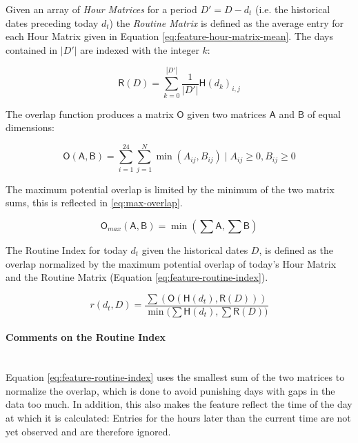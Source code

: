 Given an array of \textit{Hour Matrices} for a period $D' = D - d_t$ (i.e. the historical dates preceding today $d_t$) the \textit{Routine Matrix} is defined as the average entry for each Hour Matrix given in Equation \eqref{eq:feature-hour-matrix-mean}. The days contained in $|D'|$ are indexed with the integer $k$:

\begin{equation}
\label{eq:feature-hour-matrix-mean}
\mathsf{R}(D) = \sum_{k=0}^{|D'|} \frac{1}{|D'|} \mathsf{H}(d_{k})_{i,j}
\end{equation}

The overlap function produces a matrix $\mathsf{O}$ given two matrices $\mathsf{A}$ and $\mathsf{B}$ of equal dimensions:

\begin{equation}
\label{eq:overlap-function}
    \mathsf{O}(\mathsf{A}, \mathsf{B}) = \sum_{i=1}^{24} \sum_{j=1}^{N} \min (A_{ij}, B_{ij}) \;|\; A_{ij} \geq 0, B_{ij} \geq 0
\end{equation}

The maximum potential overlap is limited by the minimum of the two matrix sums, this is reflected in \eqref{eq:max-overlap}.

\begin{equation}
\label{eq:max-overlap}
    \mathsf{O}_{max}(\mathsf{A}, \mathsf{B}) = \min (\sum \mathsf{A}, \sum \mathsf{B})
\end{equation}

The Routine Index for today $d_t$ given the historical dates $D$, is defined as the overlap normalized by the maximum potential overlap of today's Hour Matrix and the Routine Matrix (Equation \eqref{eq:feature-routine-index}).

\begin{equation}
\label{eq:feature-routine-index}
r(d_t, D) = \frac{\sum (\mathsf{O} (\mathsf{H}(d_t), \mathsf{R}(D)))}{\min \Big(\sum \mathsf{H}(d_t), \sum \mathsf{R}(D) \Big)}
\end{equation}

\paragraph{Comments on the Routine Index}\\
Equation \eqref{eq:feature-routine-index} uses the smallest sum of the two matrices to normalize the overlap, which is done to avoid punishing days with gaps in the data too much. In addition, this also makes the feature reflect the time of the day at which it is calculated: Entries for the hours later than the current time are not yet observed and are therefore ignored.\\


